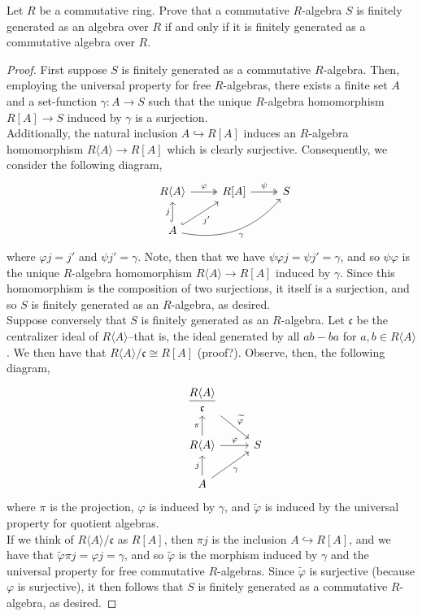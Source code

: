 \documentclass[12pt]{article}
\newenvironment{problem}[2][Problem]{\begin{trivlist}
\item[\hskip \labelsep {\bfseries #1}\hskip \labelsep {\bfseries #2.}]}{\end{trivlist}}
\theoremstyle{remark}
\begin{document}
\begin{problem}{6.15}
  Let $R$ be a commutative ring.
  Prove that a commutative $R$-algebra $S$ is finitely generated as an
  algebra over $R$ if and only if it is finitely generated as a commutative
  algebra over $R$.
\end{problem}
\begin{proof}
  First suppose $S$ is finitely generated as a commutative $R$-algebra.
  Then, employing the universal property for free $R$-algebras,
  there exists a finite set $A$ and a set-function $\gamma:A\to S$
  such that the unique $R$-algebra homomorphism $R[A]\to S$ induced by
  $\gamma$ is a surjection. \\
  \indent Additionally, the natural inclusion $A\hookrightarrow R[A]$
  induces an $R$-algebra homomorphism $R\langle A\rangle\to R[A]$ which
  is clearly surjective.
  Consequently, we consider the following diagram,
  \[
    \begin{tikzcd}
      & R\langle A\rangle \ar[r, two heads, "\varphi"]
      & R[A] \ar[r, two heads, "\psi"]
      & S \\
      & A \ar[u, hook, "j"] 
          \ar[ur, hook, "j'"'] 
          \ar[urr, "\gamma"', bend right]
    \end{tikzcd}
  \]
  where $\varphi j=j'$ and $\psi j'=\gamma$.
  Note, then that we have $\psi\varphi j=\psi j'=\gamma$, and so
  $\psi\varphi$ is the unique $R$-algebra homomorphism 
  $R\langle A\rangle\to R[A]$ induced by $\gamma$.
  Since this homomorphism is the composition of two surjections, it itself
  is a surjection, and so $S$ is finitely generated as an $R$-algebra, 
  as desired. \\
  \indent Suppose conversely that $S$ is finitely generated as an $R$-algebra.
  Let $\mathfrak{c}$ be the centralizer ideal of $R\langle A\rangle$--that is,
  the ideal generated by all $ab-ba$ for $a,b\in R\langle A\rangle$.
  We then have that $R\langle A\rangle/\mathfrak{c}\cong R[A]$ (proof?).
  Observe, then, the following diagram,
  \[
    \begin{tikzcd}
      & \displaystyle\frac{R\langle A\rangle}{\mathfrak{c}} 
      \ar[dr, "\widetilde\varphi"] \\
      & R\langle A\rangle \ar[u, "\pi"] \ar[r, "\varphi"] & S \\
      & A \ar[u, "j"] \ar[ur, "\gamma"']
    \end{tikzcd}
  \]
  where $\pi$ is the projection, $\varphi$ is induced by $\gamma$, and
  $\widetilde\varphi$ is induced by the universal property for quotient
  algebras. \\
  \indent If we think of $R\langle A\rangle/\mathfrak{c}$ as $R[A]$, then
  $\pi j$ is the inclusion $A\hookrightarrow R[A]$, and we have that
  $\widetilde\varphi\pi j=\varphi j=\gamma$, and so $\widetilde\varphi$ is
  the morphism induced by $\gamma$ and the universal property for free
  commutative $R$-algebras.
  Since $\widetilde\varphi$ is surjective (because $\varphi$ is surjective),
  it then follows that $S$ is finitely generated as a commutative $R$-algebra,
  as desired.
\end{proof}
\end{document}
